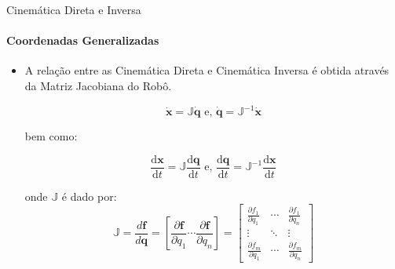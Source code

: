 \documentclass{beamer}
\begin{document}
\begin{frame}{Cinemática Direta e Inversa}
    \framesubtitle{Coordenadas Generalizadas}
    \begin{itemize}
        \item A relação entre as Cinemática Direta e Cinemática Inversa é obtida através da Matriz Jacobiana do Robô.

              \begin{equation*}
                  \mathbf{\dot{x}} = \mathbb{J}{\mathbf{\dot{q}}}
                  \text{ e, }
                  \mathbf{\dot{q}} = \mathbb{J}^{-1}{\mathbf{\dot{x}}}
              \end{equation*}

              bem como:

              \begin{equation*}
                  \frac{\text{d}\mathbf{x}}{\text{d}t} = \mathbb{J}\frac{\text{d}\mathbf{q}}{\text{d}t}
                  \text{ e, }
                  \frac{\text{d}\mathbf{q}}{\text{d}t} = \mathbb{J}^{-1}\frac{\text{d}\mathbf{x}}{\text{d}t}
              \end{equation*}

              onde $\mathbb{J}$ é dado por:
              \begin{equation*}
                  \mathbb{J}
                  =
                  \frac{d \mathbf{f}}{d \mathbf{q}}
                  =
                  \left[ \frac{\partial \mathbf{f}}{\partial q_1}
                      \cdots \frac{\partial \mathbf{f}}{\partial q_n} \right]
                  =
                  \begin{bmatrix}
                      \frac{\partial f_1}{\partial q_1} & \cdots &
                      \frac{\partial f_1}{\partial q_n}                   \\
                      \vdots                            & \ddots & \vdots \\
                      \frac{\partial f_m}{\partial q_1} & \cdots &
                      \frac{\partial f_m}{\partial q_n}
                  \end{bmatrix}
              \end{equation*}
    \end{itemize}
\end{frame}
\end{document}
